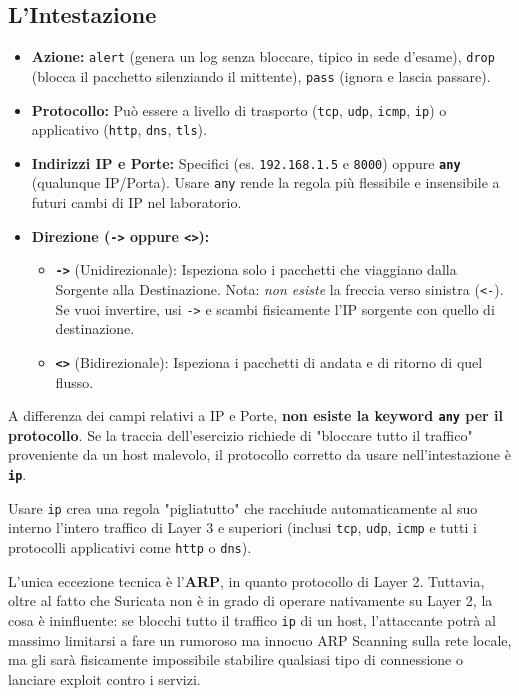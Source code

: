 \documentclass[12pt,a4paper]{report}
\begin{document}
	\subsection{L'Intestazione}
	\begin{itemize}
		\item \textbf{Azione:} \texttt{alert} (genera un log senza bloccare, tipico in sede d'esame), \texttt{drop} (blocca il pacchetto silenziando il mittente), \texttt{pass} (ignora e lascia passare).
		\item \textbf{Protocollo:} Può essere a livello di trasporto (\texttt{tcp}, \texttt{udp}, \texttt{icmp}, \texttt{ip}) o applicativo (\texttt{http}, \texttt{dns}, \texttt{tls}).
		\item \textbf{Indirizzi IP e Porte:} Specifici (es. \texttt{192.168.1.5} e \texttt{8000}) oppure \textbf{\texttt{any}} (qualunque IP/Porta). Usare \texttt{any} rende la regola più flessibile e insensibile a futuri cambi di IP nel laboratorio.
		\item \textbf{Direzione (\texttt{->} oppure \texttt{<>}):} 
		\begin{itemize}
			\item \textbf{\texttt{->}} (Unidirezionale): Ispeziona solo i pacchetti che viaggiano dalla Sorgente alla Destinazione. Nota: \textit{non esiste} la freccia verso sinistra (\texttt{<-}). Se vuoi invertire, usi \texttt{->} e scambi fisicamente l'IP sorgente con quello di destinazione.
			\item \textbf{\texttt{<>}} (Bidirezionale): Ispeziona i pacchetti di andata e di ritorno di quel flusso.
		\end{itemize}
	\end{itemize}
	
	\begin{nota}
		A differenza dei campi relativi a IP e Porte, \textbf{non esiste la keyword \texttt{any} per il protocollo}. Se la traccia dell'esercizio richiede di "bloccare tutto il traffico" proveniente da un host malevolo, il protocollo corretto da usare nell'intestazione è \textbf{\texttt{ip}}.
		
		Usare \texttt{ip} crea una regola "pigliatutto" che racchiude automaticamente al suo interno l'intero traffico di Layer 3 e superiori (inclusi \texttt{tcp}, \texttt{udp}, \texttt{icmp} e tutti i protocolli applicativi come \texttt{http} o \texttt{dns}). 
		
		L'unica eccezione tecnica è l'\textbf{ARP}, in quanto protocollo di Layer 2. Tuttavia, oltre al fatto che Suricata non è in grado di operare nativamente su Layer 2, la cosa è ininfluente: se blocchi tutto il traffico \texttt{ip} di un host, l'attaccante potrà al massimo limitarsi a fare un rumoroso ma innocuo ARP Scanning sulla rete locale, ma gli sarà fisicamente impossibile stabilire qualsiasi tipo di connessione o lanciare exploit contro i servizi.
	\end{nota}
	
\end{document}
